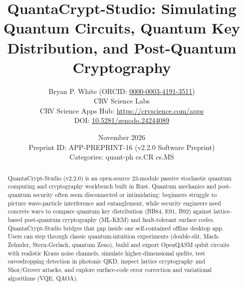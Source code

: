 \documentclass[10pt,letterpaper]{article}
\title{\textbf{QuantaCrypt-Studio: Simulating Quantum Circuits, Quantum Key Distribution, and Post-Quantum Cryptography}}
\author{Bryan P. White (ORCID: \href{https://orcid.org/0000-0003-4191-3511}{0000-0003-4191-3511}) \\ CRV Science Labs \\ \small CRV Science Apps Hub: \url{https://crvscience.com/apps} \\ \small DOI: \href{https://doi.org/10.5281/zenodo.24244089}{10.5281/zenodo.24244089}}
\date{November 2026 \\ \small Preprint ID: APP-PREPRINT-16 (v2.2.0 Software Preprint) \\ \small Categories: quant-ph \textbullet{} cs.CR \textbullet{} cs.MS}
\begin{document}
\maketitle

\begin{abstract}
QuantaCrypt-Studio (v2.2.0) is an open-source 23-module passive stochastic quantum computing and cryptography workbench built in Rust. Quantum mechanics and post-quantum security often seem disconnected or intimidating: beginners struggle to picture wave-particle interference and entanglement, while security engineers need concrete ways to compare quantum key distribution (BB84, E91, B92) against lattice-based post-quantum cryptography (ML-KEM) and fault-tolerant surface codes. QuantaCrypt-Studio bridges that gap inside one self-contained offline desktop app. Users can step through classic quantum-intuition experiments (double-slit, Mach-Zehnder, Stern-Gerlach, quantum Zeno), build and export OpenQASM qubit circuits with realistic Kraus noise channels, simulate higher-dimensional qudits, test eavesdropping detection in photonic QKD, inspect lattice cryptography and Shor/Grover attacks, and explore surface-code error correction and variational algorithms (VQE, QAOA).
\end{abstract}
\end{document}
